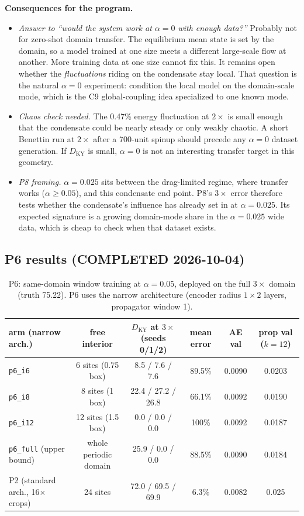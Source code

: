 \documentclass[11pt]{article}
\begin{document}
\textbf{Consequences for the program.}
\begin{itemize}[leftmargin=*]
\item \emph{Answer to ``would the system work at $\alpha{=}0$ with
  enough data?''} Probably not for zero-shot domain transfer. The
  equilibrium mean state is set by the domain, so a model trained at one
  size meets a different large-scale flow at another. More training data
  at one size cannot fix this. It remains open whether the
  \emph{fluctuations} riding on the condensate stay local. That question
  is the natural $\alpha{=}0$ experiment: condition the local model on
  the domain-scale mode, which is the C9 global-coupling idea specialized
  to one known mode.
\item \emph{Chaos check needed.} The 0.47\% energy fluctuation at
  $2\times$ is small enough that the condensate could be nearly steady or
  only weakly chaotic. A short Benettin run at $2\times$ after a 700-unit
  spinup should precede any $\alpha{=}0$ dataset generation. If
  $D_{\mathrm{KY}}$ is small, $\alpha{=}0$ is not an interesting
  transfer target in this geometry.
\item \emph{P8 framing.} $\alpha{=}0.025$ sits between the drag-limited
  regime, where transfer works ($\alpha\ge0.05$), and this condensate end
  point. P8's $3\times$ error therefore tests whether the condensate's
  influence has already set in at $\alpha{=}0.025$. Its expected
  signature is a growing domain-mode share in the $\alpha{=}0.025$ wide
  data, which is cheap to check when that dataset exists.
\end{itemize}

\subsection{P6 results (COMPLETED 2026-10-04)}
\label{sec:p6_results}

\begin{table}[h]
\centering
\small
\begin{tabular}{lccccc}
\toprule
arm (narrow arch.) & free interior & $D_{\mathrm{KY}}$ at $3\times$ (seeds 0/1/2) & mean error & AE val & prop val ($k{=}12$) \\
\midrule
\texttt{p6\_i6} & 6 sites (0.75 box) & 8.5 / 7.6 / 7.6 & 89.5\% & 0.0090 & 0.0203 \\
\texttt{p6\_i8} & 8 sites (1 box) & 22.4 / 27.2 / 26.8 & 66.1\% & 0.0092 & 0.0190 \\
\texttt{p6\_i12} & 12 sites (1.5 box) & 0.0 / 0.0 / 0.0 & 100\% & 0.0092 & 0.0187 \\
\texttt{p6\_full} (upper bound) & whole periodic domain & 25.9 / 0.0 / 0.0 & 88.5\% & 0.0090 & 0.0184 \\
\midrule
P2 (standard arch., 16$\times$ crops) & 24 sites & 72.0 / 69.5 / 69.9 & 6.3\% & 0.0082 & 0.025 \\
\bottomrule
\end{tabular}
\caption{P6: same-domain window training at $\alpha{=}0.05$, deployed on
the full $3\times$ domain (truth 75.22). P6 uses the narrow
architecture (encoder radius $1\times2$ layers, propagator window 1).}
\label{tab:p6}
\end{table}
\end{document}
